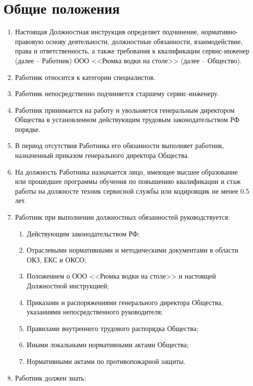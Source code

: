 \documentclass[a4paper, 12pt, twoside]{article}
\begin{document}
\section{Общие положения}
\begin{enumerate}[label=1.\arabic*.]
  \item Настоящая Должностная инструкция определяет подчинение, нормативно-правовую основу
   деятельности, должностные обязанности, взаимодействие, права и ответственность, а также 
   требования к квалификации сервис-инженер (далее – Работник) ООО <<Рюмка водки на столе>> 
   (далее – Общество).
  \item Работник относится к категории специалистов.
  \item Работник непосредственно подчиняется старшему сервис-инженеру.
  \item Работник принимается на работу и увольняется генеральным директором
Общества в установленном действующим трудовым законодательством РФ порядке.
  \item В период отсутствия Работника его обязанности выполняет работник, назначенный приказом генерального директора Общества.
  \item На должность Работника назначается лицо, имеющее 
высшее образование или прошедшее программы обучения по повышению квалификации и стаж работы на должносте техник сервисной службы или кодировщик не менее 0.5 лет.
  \item Работник при выполнении должностных обязанностей руководствуется:
  \begin{enumerate}[label=-]
    \item Действующим законодательством РФ;
    \item Отраслевыми нормативными и методическими документами в области ОКЗ, ЕКС и ОКСО;
    \item Положением о ООО <<Рюмка водки на столе>> и настоящей Должностной инструкцией;
    \item Приказами и распоряжениями генерального директора Общества, указаниями непосредственного руководителя;
    \item Правилами внутреннего трудового распорядка Общества;
    \item Иными локальными нормативными актами Общества;
    \item Нормативными актами по противопожарной защиты.
  \end{enumerate}
  \item Работник должен знать:
  \begin{enumerate}[label=-]

\end{enumerate}
\end{enumerate}
\end{document}
